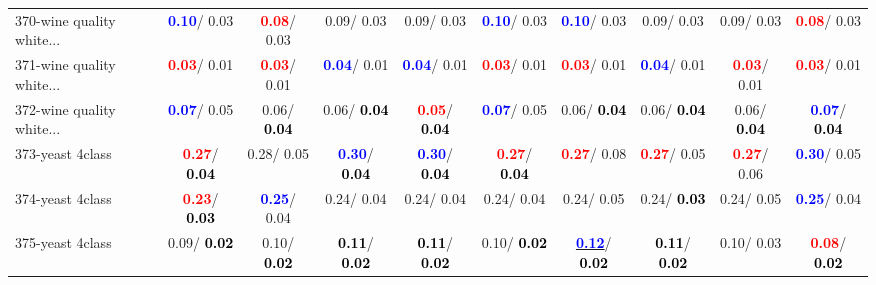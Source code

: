 \begin{table}[h]
\begin{center}
{\begin{tabular}{lc|c|c|c|c|c|c|c|c}
370-wine quality white... & \textcolor{blue}{\textbf{  0.10}}/  0.03 & \textcolor{red}{\textbf{  0.08}}/  0.03 &   0.09/  0.03 &   0.09/  0.03 & \textcolor{blue}{\textbf{  0.10}}/  0.03 & \textcolor{blue}{\textbf{  0.10}}/  0.03 &   0.09/  0.03 &   0.09/  0.03 & \textcolor{red}{\textbf{  0.08}}/  0.03 \\
371-wine quality white... & \textcolor{red}{\textbf{  0.03}}/  0.01 & \textcolor{red}{\textbf{  0.03}}/  0.01 & \textcolor{blue}{\textbf{  0.04}}/  0.01 & \textcolor{blue}{\textbf{  0.04}}/  0.01 & \textcolor{red}{\textbf{  0.03}}/  0.01 & \textcolor{red}{\textbf{  0.03}}/  0.01 & \textcolor{blue}{\textbf{  0.04}}/  0.01 & \textcolor{red}{\textbf{  0.03}}/  0.01 & \textcolor{red}{\textbf{  0.03}}/  0.01 \\
372-wine quality white... & \textcolor{blue}{\textbf{  0.07}}/  0.05 &   0.06/\textcolor{black}{\textbf{  0.04}} &   0.06/\textcolor{black}{\textbf{  0.04}} & \textcolor{red}{\textbf{  0.05}}/\textcolor{black}{\textbf{  0.04}} & \textcolor{blue}{\textbf{  0.07}}/  0.05 &   0.06/\textcolor{black}{\textbf{  0.04}} &   0.06/\textcolor{black}{\textbf{  0.04}} &   0.06/\textcolor{black}{\textbf{  0.04}} & \textcolor{blue}{\textbf{  0.07}}/\textcolor{black}{\textbf{  0.04}} \\
373-yeast 4class & \textcolor{red}{\textbf{  0.27}}/\textcolor{black}{\textbf{  0.04}} &   0.28/  0.05 & \textcolor{blue}{\textbf{  0.30}}/\textcolor{black}{\textbf{  0.04}} & \textcolor{blue}{\textbf{  0.30}}/\textcolor{black}{\textbf{  0.04}} & \textcolor{red}{\textbf{  0.27}}/\textcolor{black}{\textbf{  0.04}} & \textcolor{red}{\textbf{  0.27}}/  0.08 & \textcolor{red}{\textbf{  0.27}}/  0.05 & \textcolor{red}{\textbf{  0.27}}/  0.06 & \textcolor{blue}{\textbf{  0.30}}/  0.05 \\ \hline
374-yeast 4class & \textcolor{red}{\textbf{  0.23}}/\textcolor{black}{\textbf{  0.03}} & \textcolor{blue}{\textbf{  0.25}}/  0.04 &   0.24/  0.04 &   0.24/  0.04 &   0.24/  0.04 &   0.24/  0.05 &   0.24/\textcolor{black}{\textbf{  0.03}} &   0.24/  0.05 & \textcolor{blue}{\textbf{  0.25}}/  0.04 \\
375-yeast 4class &   0.09/\textcolor{black}{\textbf{  0.02}} &   0.10/\textcolor{black}{\textbf{  0.02}} & \textcolor{black}{\textbf{  0.11}}/\textcolor{black}{\textbf{  0.02}} & \textcolor{black}{\textbf{  0.11}}/\textcolor{black}{\textbf{  0.02}} &   0.10/\textcolor{black}{\textbf{  0.02}} & \underline{\textcolor{blue}{\textbf{  0.12}}}/\textcolor{black}{\textbf{  0.02}} & \textcolor{black}{\textbf{  0.11}}/\textcolor{black}{\textbf{  0.02}} &   0.10/  0.03 & \textcolor{red}{\textbf{  0.08}}/\textcolor{black}{\textbf{  0.02}} \\

\end{tabular}}
\end{center}
\end{table}
